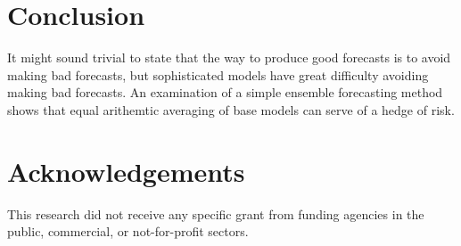 \documentclass[11pt,3p,review,authoryear]{elsarticle}
\begin{document}
\section{Conclusion}
It might sound trivial to state that the way to produce good forecasts is to avoid making bad forecasts, but sophisticated models have great difficulty avoiding making bad forecasts. An examination of a simple ensemble forecasting method shows that equal arithemtic averaging of base models can serve of a hedge of risk.

\section*{Acknowledgements}

This research did not receive any specific grant from funding agencies in the public, commercial, or not-for-profit sectors.



\end{document}
